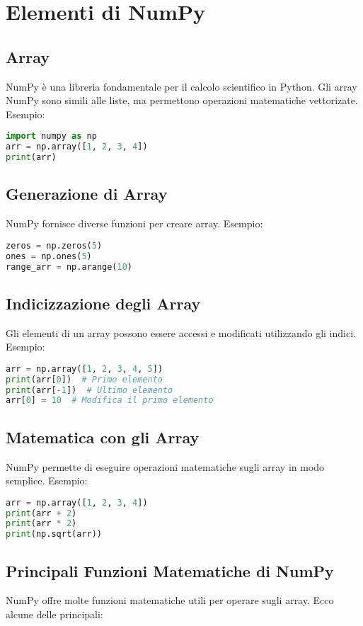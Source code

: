 \section{Elementi di NumPy}

\subsection{Array}
NumPy è una libreria fondamentale per il calcolo scientifico in Python. Gli array NumPy sono simili alle liste, ma permettono operazioni matematiche vettorizate. Esempio:
\begin{lstlisting}[language=Python]
import numpy as np
arr = np.array([1, 2, 3, 4])
print(arr)
\end{lstlisting}

\subsection{Generazione di Array}
NumPy fornisce diverse funzioni per creare array. Esempio:
\begin{lstlisting}[language=Python]
zeros = np.zeros(5)
ones = np.ones(5)
range_arr = np.arange(10)
\end{lstlisting}

\subsection{Indicizzazione degli Array}
Gli elementi di un array possono essere accessi e modificati utilizzando gli indici. Esempio:
\begin{lstlisting}[language=Python]
arr = np.array([1, 2, 3, 4, 5])
print(arr[0])  # Primo elemento
print(arr[-1])  # Ultimo elemento
arr[0] = 10  # Modifica il primo elemento
\end{lstlisting}

\subsection{Matematica con gli Array}
NumPy permette di eseguire operazioni matematiche sugli array in modo semplice. Esempio:
\begin{lstlisting}[language=Python]
arr = np.array([1, 2, 3, 4])
print(arr + 2)
print(arr * 2)
print(np.sqrt(arr))
\end{lstlisting}

\subsection{Principali Funzioni Matematiche di NumPy}
NumPy offre molte funzioni matematiche utili per operare sugli array. Ecco alcune delle principali:

